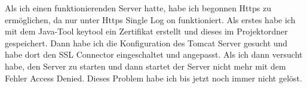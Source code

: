 Als ich einen funktionierenden Server hatte, habe ich begonnen Https zu ermöglichen, da nur unter Https Single Log on funktioniert.
\newline
Als erstes habe ich mit dem Java-Tool keytool ein Zertifikat erstellt und dieses im Projektordner gespeichert.
\newline
Dann habe ich die Konfiguration des Tomcat Server gesucht und habe dort den SSL Connector eingeschaltet und angepasst.
\newline
Als ich dann versucht habe, den Server zu starten und dann startet der Server nicht mehr mit dem Fehler Access Denied. Dieses Problem habe ich bis jetzt noch immer nicht gelöst.
